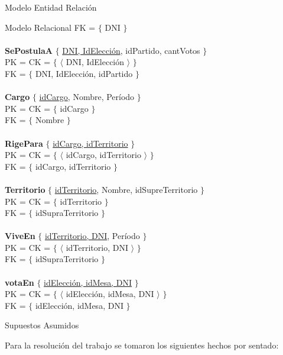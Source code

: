 \begin{section}{Modelo Entidad Relaci\'on}
\begin{subsection}{Modelo Relacional}
FK = $ \lbrace $ DNI $ \rbrace $\\
\\
\textbf{SePostulaA} $ \lbrace $ \underline{DNI, IdElecci\'on}, idPartido, cantVotos $ \rbrace $ \\
PK = CK = $ \lbrace $ $ \langle $ DNI, IdElecci\'on $ \rangle $ $ \rbrace $ \\
FK = $ \lbrace $ DNI, IdElecci\'on, idPartido $ \rbrace $\\
\\
\textbf{Cargo} $ \lbrace $ \underline{idCargo}, Nombre, Período $ \rbrace $ \\
PK = CK = $ \lbrace $ idCargo $ \rbrace $ \\
FK = $ \lbrace $ Nombre $ \rbrace $\\
\\
\textbf{RigePara} $ \lbrace $ \underline{idCargo, idTerritorio} $ \rbrace $ \\
PK = CK = $ \lbrace $ $ \langle $ idCargo, idTerritorio $ \rangle $ $ \rbrace $ \\
FK = $ \lbrace $ idCargo, idTerritorio $ \rbrace $\\
\\
\textbf{Territorio} $ \lbrace $ \underline{idTerritorio}, Nombre, idSupreTerritorio $ \rbrace $ \\
PK = CK = $ \lbrace $ idTerritorio $ \rbrace $ \\
FK = $ \lbrace $ idSupraTerritorio $ \rbrace $\\
\\
\textbf{ViveEn} $ \lbrace $ \underline{idTerritorio, DNI}, Per\'iodo $ \rbrace $ \\
PK = CK = $ \lbrace $ $ \langle $ idTerritorio, DNI $ \rangle $ $ \rbrace $ \\
FK = $ \lbrace $ idSupraTerritorio $ \rbrace $\\
\\
\textbf{votaEn} $ \lbrace $ \underline{idElecci\'on, idMesa, DNI} $ \rbrace $ \\
PK = CK = $ \lbrace $ $ \langle $ idElecci\'on, idMesa, DNI $ \rangle $ $ \rbrace $ \\
FK = $ \lbrace $ idElecci\'on, idMesa, DNI $ \rbrace $\\

\end{subsection}

\begin{subsection}{Supuestos Asumidos}

Para la resoluci\'on del trabajo se tomaron los siguientes hechos por sentado:


\end{subsection}
\end{section}
